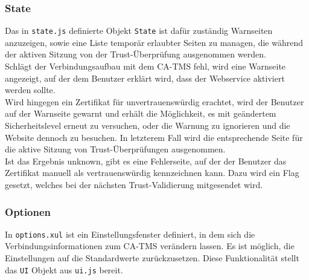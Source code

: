 \documentclass[accentcolor=tud1c,article,colorback,11pt]{tudreport}
\begin{document}
\subsubsection{State}
Das in \texttt{state.js} definierte Objekt \texttt{State} ist dafür zuständig Warnseiten anzuzeigen, sowie eine Liste temporär erlaubter Seiten zu managen, die während der aktiven Sitzung von der Trust-Überprüfung ausgenommen werden.\\
Schlägt der Verbindungsaufbau mit dem CA-TMS fehl, wird eine Warnseite angezeigt, auf der dem Benutzer erklärt wird, dass der Webservice aktiviert werden sollte.\\
Wird hingegen ein Zertifikat für unvertrauenswürdig erachtet, wird der Benutzer auf der Warnseite gewarnt und erhält die Möglichkeit, es mit geändertem Sicherheitslevel erneut zu versuchen, oder die Warnung zu ignorieren und die Website dennoch zu besuchen. In letzterem Fall wird die entsprechende Seite für die aktive Sitzung von Trust-Überprüfungen ausgenommen.\\
Ist das Ergebnis unknown, gibt es eine Fehlerseite, auf der der Benutzer das Zertifikat manuell als vertrauenswürdig kennzeichnen kann. Dazu wird ein Flag gesetzt, welches bei der nächsten Trust-Validierung mitgesendet wird.

\subsubsection{Optionen} 
In \texttt{options.xul} ist ein Einstellungsfenster definiert, in dem sich die Verbindungsinformationen zum CA-TMS verändern lassen. Es ist möglich, die Einstellungen auf die Standardwerte zurückzusetzen. Diese Funktionalität stellt das \texttt{UI} Objekt aus \texttt{ui.js} bereit.

\newpage


\end{document}

